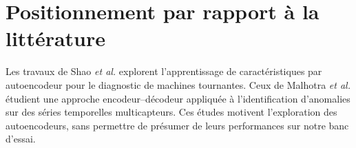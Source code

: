 \section{Positionnement par rapport à la littérature}
Les travaux de Shao \emph{et al.} \cite{shao2017} explorent l'apprentissage de caractéristiques par autoencodeur pour le diagnostic de machines tournantes. Ceux de Malhotra \emph{et al.} \cite{malhotra2016} étudient une approche encodeur--décodeur appliquée à l'identification d'anomalies sur des séries temporelles multicapteurs. Ces études motivent l'exploration des autoencodeurs, sans permettre de présumer de leurs performances sur notre banc d'essai.


